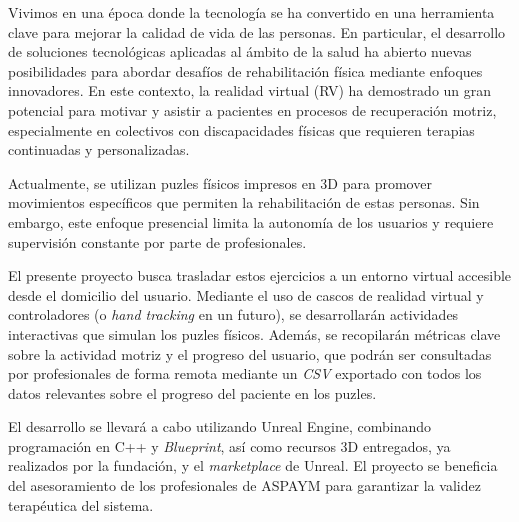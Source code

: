 

Vivimos en una época donde la tecnología se ha convertido en una herramienta clave para mejorar la calidad de vida de las personas. En particular, el desarrollo de soluciones tecnológicas aplicadas al ámbito de la salud ha abierto nuevas posibilidades para abordar desafíos de rehabilitación física mediante enfoques innovadores. En este contexto, la realidad virtual (RV) ha demostrado un gran potencial para motivar y asistir a pacientes en procesos de recuperación motriz, especialmente en colectivos con discapacidades físicas que requieren terapias continuadas y personalizadas.

Actualmente, se utilizan puzles físicos impresos en 3D para promover movimientos específicos que permiten la rehabilitación de estas personas. Sin embargo, este enfoque presencial limita la autonomía de los usuarios y requiere supervisión constante por parte de profesionales.

El presente proyecto busca trasladar estos ejercicios a un entorno virtual accesible desde el domicilio del usuario. Mediante el uso de cascos de realidad virtual y controladores (o \textit{hand tracking} en un futuro), se desarrollarán actividades interactivas que simulan los puzles físicos. Además, se recopilarán métricas clave sobre la actividad motriz y el progreso del usuario, que podrán ser consultadas por profesionales de forma remota mediante un \textit{CSV} exportado con todos los datos relevantes sobre el progreso del paciente en los puzles.

El desarrollo se llevará a cabo utilizando Unreal Engine, combinando programación en C++ y \textit{Blueprint}, así como recursos 3D entregados, ya realizados por la fundación, y el \textit{marketplace} de Unreal. El proyecto se beneficia del asesoramiento de los profesionales de ASPAYM para garantizar la validez terapéutica del sistema.
